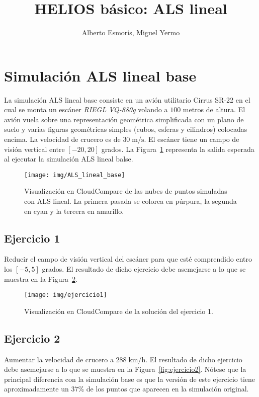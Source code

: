 \documentclass[]{article}
\title{HELIOS básico: ALS lineal}
\author{Alberto Esmorís, Miguel Yermo}
\date{}
\begin{document}
	
	\maketitle
	
	
	
	\section*{Simulación ALS lineal base}
	La simulación ALS lineal base consiste en un avión utilitario Cirrus SR-22 en el cual se monta un escáner \textit{RIEGL VQ-880g} volando a $100$ metros de altura. El avión vuela sobre una representación geométrica simplificada con un plano de suelo y varias figuras geométricas simples (cubos, esferas y cilindros) colocadas encima. La velocidad de crucero es de $30\;\text{m}/\text{s}$. El escáner tiene un campo de visión vertical entre $[-20, 20]$ grados. La Figura~\ref{fig:als_lineal_base} representa la salida esperada al ejecutar la simulación ALS lineal balse.
	
	\begin{figure}[htb]
		\centering
		\texttt{[image: img/ALS\_lineal\_base]}
		\caption{Visualización en CloudCompare de las nubes de puntos simuladas con ALS lineal. La primera pasada se colorea en púrpura, la segunda en cyan y la tercera en amarillo.}
		\label{fig:als_lineal_base}
	\end{figure}


	\pagebreak
	

	\subsection*{Ejercicio 1}
	Reducir el campo de visión vertical del escáner para que esté comprendido entro los $[-5, 5]$ grados. El resultado de dicho ejercicio debe asemejarse a lo que se muestra en la Figura~\ref{fig:ejercicio1}.
	
	\begin{figure}[htb]
		\centering
		\texttt{[image: img/ejercicio1]}
		\caption{Visualización en CloudCompare de la solución del ejercicio 1.}
		\label{fig:ejercicio1}
	\end{figure}


	\subsection*{Ejercicio 2}
	Aumentar la velocidad de crucero a $288\;\text{km}/\text{h}$. El resultado de dicho ejercicio debe asemejarse a lo que se muestra en la Figura~\ref{fig:ejercicio2}. Nótese que la principal diferencia con la simulación base es que la versión de este ejercicio tiene aproximadamente un $37\%$ de los puntos que aparecen en la simulación original.
	
\end{document}
